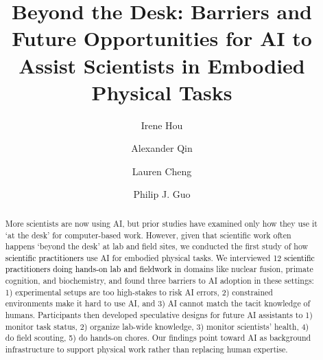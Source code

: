 \documentclass[sigconf]{acmart}
\newcommand{\rev}[1]{\textcolor{black}{#1}} %
\newcommand{\rev}[1]{#1} %
\begin{document}
\title{Beyond the Desk: Barriers and Future Opportunities for AI to Assist Scientists in Embodied Physical Tasks}


\author{Irene Hou}

\author{Alexander Qin}

\author{Lauren Cheng}

\author{Philip J. Guo}

\renewcommand{\shortauthors}{Hou et al.}

\begin{abstract}


More scientists are now using AI, but prior studies have examined only how they use it `at the desk' for computer-based work. However, given that scientific work often happens `beyond the desk' at lab and field sites, we conducted the first study of how \rev{scientific practitioners} use AI for embodied physical tasks. We interviewed 12 \rev{scientific practitioners doing hands-on lab and fieldwork} in domains like nuclear fusion, primate cognition, and biochemistry, and found three barriers to AI adoption in these settings: 1) experimental setups are too high-stakes to risk AI errors, 2) constrained environments make it hard to use AI, and 3) AI cannot match the tacit knowledge of humans. Participants then developed speculative designs for future AI assistants to 1) monitor task status, 2) organize lab-wide knowledge, 3) monitor scientists' health, 4) do field scouting, 5) do hands-on chores. Our findings point toward AI as background infrastructure to support physical work rather than replacing human expertise.


\end{abstract}
\end{document}
